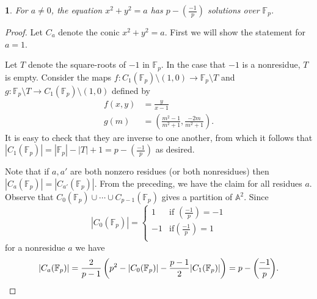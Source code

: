 \documentclass[10pt,a4paper]{amsart}
\numberwithin{equation}{section}
\numberwithin{figure}{section}
\theoremstyle{definition}
\theoremstyle{remark}
\theoremstyle{plain}
\theoremstyle{plain}
\theoremstyle{definition}
\theoremstyle{plain}
\newtheorem{prop}{\protect\propositionname}[section]
\theoremstyle{plain}
\providecommand{\propositionname}{Proposition}
\newcommand{\legendre}[2]{\genfrac{(}{)}{}{}{#1}{#2}}
\newcommand{\F}{\mathbb{F}}
\begin{document}
	\begin{prop}\label{prop:circle-solutions} 
		For $a \neq 0$, the equation $x^2 + y^2 = a$ has $p - \legendre{-1}{p}$ 
		solutions over $\F_p$.
	\end{prop} 
	\begin{proof} 
		Let $C_a$ denote the conic $x^2 + y^2 = a$. 
		First we will show the statement for $a=1$.
		
		Let $T$ denote the square-roots of $-1$ in $\F_p$. In the case
		that $-1$ is a nonresidue, $T$ is empty. Consider the maps $f\colon C_1(\F_p)
		\setminus (1,0) \to \F_p \setminus T$ and $g\colon \F_p
		\setminus T \to C_1(\F_p) \setminus (1,0)$ defined by 
		\begin{align*} 
		f(x,y) &= \frac{y}{x-1} \\ 
		g(m) &= \left(\frac{m^2 - 1}{m^2 + 1}, \frac{-2m}{m^2 + 1}\right).
		\end{align*} 
		It is easy to check that they are inverse to one
		another, from which it follows that $|C_1(\F_p)| = |\F_p| - |T| + 1 = p -
		\legendre{-1}{p}$ as desired.
		
		Note that if $a,a'$ are both nonzero residues (or both nonresidues)
		then $|C_a(\F_p)| = |C_{a'}(\F_p)|$. From the preceding, we have the claim for all residues
		$a$. Observe that $C_0(\F_p) \cup \cdots \cup C_{p-1}(\F_p)$ gives a partition of
		$\mathbb{A}^2$. Since 
		\[ |C_0(\F_p)| = \begin{cases}
		1 & \text{if } \legendre{-1}{p} = -1 \\
		-1 & \text{if} \legendre{-1}{p} = 1 \\
		\end{cases} \] 
		for a nonresidue $a$ we have 
		\[ |C_a(\F_p)| = \frac{2}{p-1} 
		\left(p^2 - |C_0(\F_p)| - \frac{p-1}{2}|C_1(\F_p)|\right) = 
		p - \legendre{-1}{p}. \qedhere \] 
	\end{proof}
	
\end{document}
